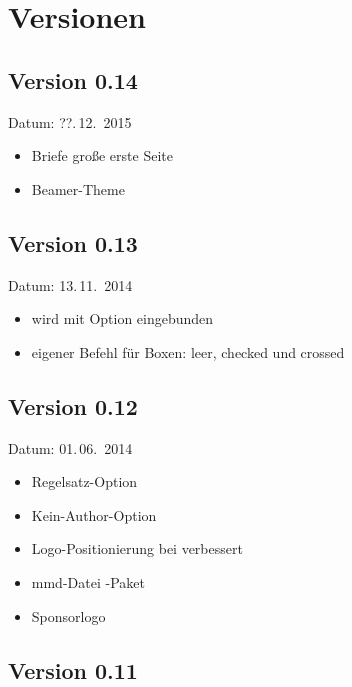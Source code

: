 
\cleardoublepage
\section{Versionen}

\subsection{Version 0.14}

Datum: ??.\,12.~2015

\begin{itemize}
	\item Briefe große erste Seite
	\item Beamer-Theme
\end{itemize}

\subsection{Version 0.13}

Datum: 13.\,11.~2014

\begin{itemize}
	\item {} wird mit Option  eingebunden
	\item eigener Befehl  für Boxen: leer, checked und crossed
\end{itemize}

\subsection{Version 0.12}

Datum: 01.\,06.~2014

\begin{itemize}
	\item Regelsatz-Option 
	\item Kein-Author-Option 
	\item Logo-Positionierung bei  verbessert
	\item mmd-Datei -Paket
	\item Sponsorlogo
\end{itemize}

\subsection{Version 0.11}

